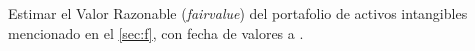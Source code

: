 Estimar el Valor Razonable (\textit{\gls{fairvalue}}) del portafolio de activos intangibles mencionado en el  \autoref{sec:f}, con fecha de valores a \textcolor{principal}{\fechaValores}.